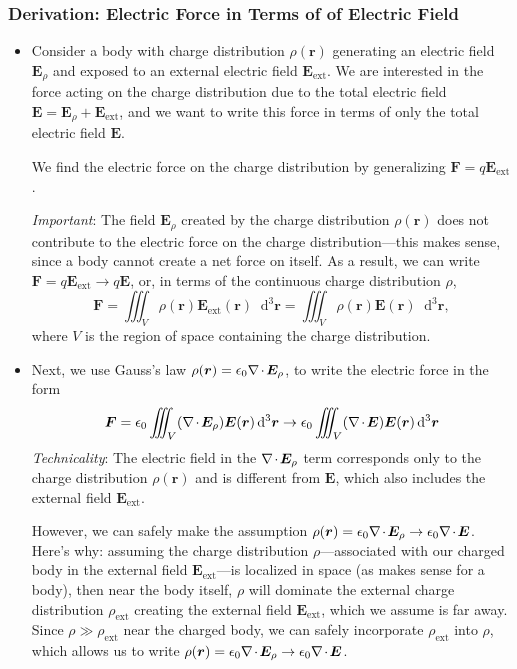\documentclass[11pt, a4paper]{article}
\newcommand{\diff}{\mathop{}\!\mathrm{d}} %
\newcommand{\dr}{\diff^{3} \r}  %
\renewcommand{\vec}[1]{\bm{#1}} %
\renewcommand{\r}{\vec{r}}
\newcommand{\E}{\vec{E}} %
\newcommand{\ee}{\epsilon_{0}}  %
\renewcommand{\div}{\nabla \mspace{-2mu} \cdot \mspace{-2mu}}
\begin{document}
\subsubsection{Derivation: Electric Force in Terms of of Electric Field}
\begin{itemize}

    \item Consider a body with charge distribution $ \rho(\r) $ generating an electric field $ \E_{\rho} $ and exposed to an external electric field $ \E_{\text{ext}} $. We are interested in the force acting on the charge distribution due to the total electric field $ \E = \E_{\rho} + \E_{\text{ext}}$, and we want to write this force in terms of only the total electric field $ \E $.

	We find the electric force on the charge distribution by generalizing $ \vec{F} = q \E_{\text{ext}} $. 

    \textit{Important}: The field $ \E_{\rho} $ created by the charge distribution $ \rho(\r) $ does not contribute to the electric force on the charge distribution---this makes sense, since a body cannot create a net force on itself. As a result, we can write $ \vec{F} = q \E_{\text{ext}} \to q \E $, or, in terms of the continuous charge distribution $ \rho $,
	\begin{equation*}
		\vec{F} = \iiint_{V} \rho(\r) \E_{\text{ext}}(\r) \dr = \iiint_{V} \rho(\r) \E(\r) \dr,
	\end{equation*}
	where $ V $ is the region of space containing the charge distribution.
	
    \label{ss:e-force}
	\item Next, we use Gauss's law $ \rho(\r) = \ee \div \E_{\rho} $, to write the electric force in the form
	\begin{equation*}
		\vec{F} = \ee \iiint_{V} (\div \E_{\rho}) \E(\r) \dr \to \ee \iiint_{V} (\div \E) \E(\r) \dr 
	\end{equation*}
    \textit{Technicality}: The electric field in the $ \div \E_{\rho} $ term corresponds only to the charge distribution $ \rho(\r) $ and is different from $ \E $, which also includes the external field $ \E_{\text{ext}} $.

    However, we can safely make the assumption $ \rho(\r) = \ee \div \E_{\rho} \to \ee \div \E $. Here's why: assuming the charge distribution $ \rho $---associated with our charged body in the external field $ \E_{\text{ext}} $---is localized in space (as makes sense for a body), then near the body itself, $ \rho $ will dominate the external charge distribution $ \rho_{\text{ext}} $ creating the external field $ \E_{\text{ext}} $, which we assume is far away. Since $ \rho \gg \rho_{\text{ext}} $ near the charged body, we can safely incorporate $ \rho_{\text{ext}} $ into $ \rho $, which allows us to write $ \rho(\r) = \ee \div \E_{\rho} \to \ee \div \E $.


\end{itemize}
\end{document}
